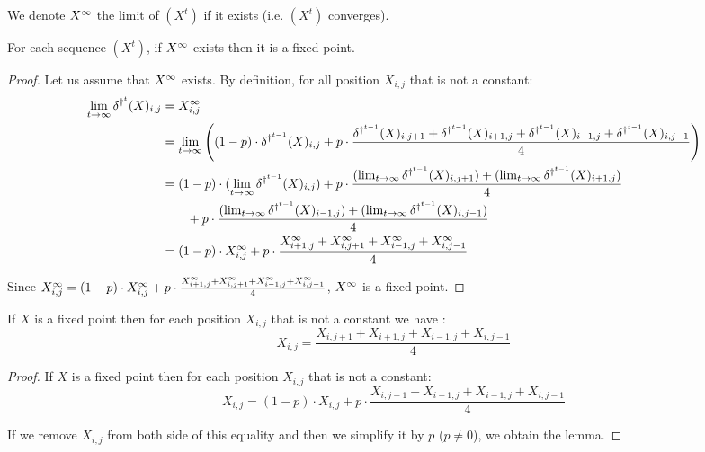 
\begin{defi}
  We denote $X^{\infty}$ the limit of $(X^t)$ if it exists (i.e. $(X^t)$ converges).
\end{defi}

\begin{lemma}
 \label{fix}
 For each sequence $(X^t)$, if $X^{\infty}$ exists then it is a fixed point.
\end{lemma}

\begin{proof}
  Let us assume that $X^{\infty}$ exists. By definition, for all position $X_{i,j}$ that is not a constant:
   \[\begin{split}
      \lim_{t \rightarrow \infty} \delta^{\dag^t}(X)_{i,j} & = X^{\infty}_{i,j} \\
        & = \lim_{t \rightarrow \infty} \left( (1-p) \cdot \delta^{\dag^{t-1}}(X)_{i,j} + p \cdot \frac{\delta^{\dag^{t-1}}(X)_{i,j+1} + \delta^{\dag^{t-1}}(X)_{i+1,j} + \delta^{\dag^{t-1}}(X)_{i-1,j} + \delta^{\dag^{t-1}}(X)_{i,j-1}}{4} \right) \\
        & = (1-p) \cdot (\lim_{t \rightarrow \infty} \delta^{\dag^{t-1}}(X)_{i,j}) + p \cdot \frac{(\lim_{t \rightarrow \infty} \delta^{\dag^{t-1}}(X)_{i,j+1}) + (\lim_{t \rightarrow \infty} \delta^{\dag^{t-1}}(X)_{i+1,j})}{4}\\
        & \qquad + p \cdot \frac{(\lim_{t \rightarrow \infty} \delta^{\dag^{t-1}}(X)_{i-1,j}) + (\lim_{t \rightarrow \infty} \delta^{\dag^{t-1}}(X)_{i,j-1})}{4} \\
        & = (1-p) \cdot X^{\infty}_{i,j} + p \cdot \frac{X^{\infty}_{i+1,j} + X^{\infty}_{i,j+1} + X^{\infty}_{i-1,j} + X^{\infty}_{i,j-1}}{4}
 \end{split}\] 

Since $X^{\infty}_{i,j} = (1-p) \cdot X^{\infty}_{i,j} + p \cdot \frac{X^{\infty}_{i+1,j} + X^{\infty}_{i,j+1} + X^{\infty}_{i-1,j} + X^{\infty}_{i,j-1}}{4}$, $X^{\infty}$ is a fixed point.

\end{proof}

\begin{lemma}
 \label{aver}
 If $X$ is a fixed point then for each position $X_{i,j}$ that is not a constant we have : 
\[ X_{i,j} = \frac{X_{i,j+1} + X_{i+1,j} + X_{i-1,j} + X_{i,j-1}}{4} \]
\end{lemma}

\begin{proof}
  If $X$ is a fixed point then for each position $X_{i,j}$ that is not a constant:
  \[ X_{i,j} = (1-p) \cdot X_{i,j} + p \cdot \frac{X_{i,j+1} + X_{i+1,j} + X_{i-1,j} + X_{i,j-1}}{4} \]
  
  If we remove $X_{i,j}$ from both side of this equality and then we simplify it by $p$ ($p \neq 0$), we obtain the lemma.
\end{proof}

